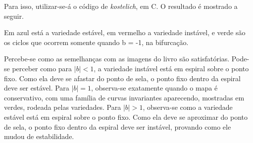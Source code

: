 \documentclass{article}[twocolumn]
\begin{document}
	Para isso, utilizar-se-\'a o c\'odigo de \textit{kostelich}, em C. O resultado
	\'e mostrado a seguir.

	Em azul est\'a a variedade est\'avel, em vermelho a variedade inst\'avel, e verde s\~ao
	os ciclos que ocorrem somente quando b = -1, na bifurca\c{c}\~ao.
	\begin{figure}[H]
		\centering
	\end{figure}
	Percebe-se como as semelhan\c{c}as com as imagens do livro s\~ao satisfat\'orias.
	Pode-se perceber como para $|b| < 1$, a variedade inst\'avel est\'a em espiral sobre o
	ponto fixo. Como ela deve se afastar do ponto de sela, o ponto fixo dentro da espiral deve
	ser est\'avel. Para $|b| = 1$, observa-se exatamente quando o mapa \'e conservativo,
	com uma fam\'ilia de curvas invariantes aparecendo, mostradas em verdes, rodeada pelas
	variedades. Para $|b| > 1$, observa-se como a variedade est\'avel est\'a em espiral
	sobre o ponto fixo. Como ela deve se aproximar do ponto de sela, o ponto fixo
	dentro da espiral deve ser inst\'avel, provando como ele mudou de estabilidade.
\end{document}
